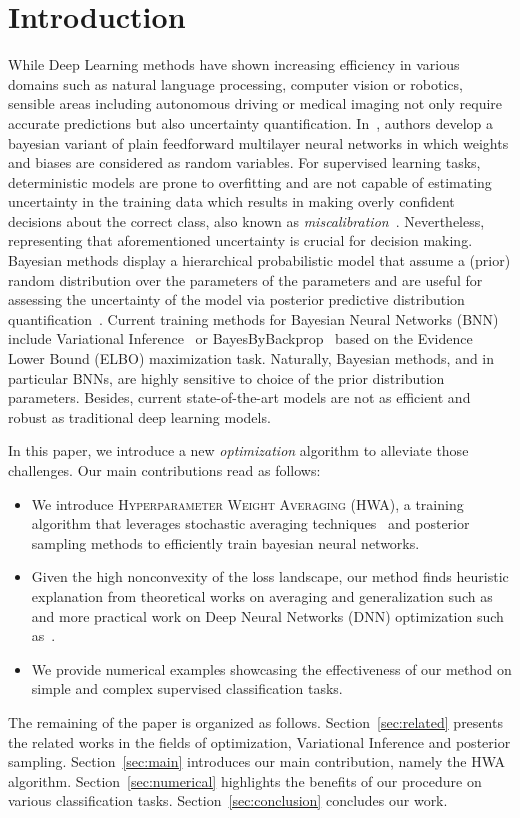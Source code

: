 \documentclass[tablecaption=bottom,wcp]{jmlr}
\begin{document}
\section{Introduction}
While Deep Learning methods have shown increasing efficiency in various domains such as natural language processing, computer vision or robotics, sensible areas including autonomous driving or medical imaging not only require accurate predictions but also uncertainty quantification.
In~\citep{neal2012bayesian}, authors develop a bayesian variant of plain feedforward multilayer neural networks in which weights and biases are considered as random variables.
For supervised learning tasks, deterministic models are prone to overfitting and are not capable of estimating uncertainty in the training data which results in making overly confident decisions about the correct class, also known as \emph{miscalibration}~\citep{guo2017calibration,kendall2017uncertainties}.
Nevertheless, representing that aforementioned uncertainty is crucial for decision making.
Bayesian methods display a hierarchical probabilistic model that assume a (prior) random distribution over the parameters of the parameters and are useful for assessing the uncertainty of the model via posterior predictive distribution quantification~\citep{blundell2015weight,kingma2015variational}.
Current training methods for Bayesian Neural Networks (BNN)~\citep{neal2012bayesian} include Variational Inference~\citep{graves2011practical, hoffman2013stochastic} or BayesByBackprop~\citep{blundell2015weight} based on the Evidence Lower Bound (ELBO) maximization task.
Naturally, Bayesian methods, and in particular BNNs, are highly sensitive to choice of the prior distribution parameters.
Besides, current state-of-the-art models are not as efficient and robust as traditional deep learning models.

In this paper, we introduce a new \emph{optimization} algorithm to alleviate those challenges.
Our main contributions read as follows:
\begin{itemize}
\item We introduce \textsc{Hyperparameter Weight Averaging} (HWA), a training algorithm that leverages stochastic averaging techniques~\citep{polyak1992acceleration} and posterior sampling methods to efficiently train bayesian neural networks.
\item Given the high nonconvexity of the loss landscape, our method finds heuristic explanation from theoretical works on averaging and generalization such as~\citep{keskar2016large,he2019asymmetric} and more practical work on Deep Neural Networks (DNN) optimization such as~\citep{izmailov2018averaging}.
\item We provide numerical examples showcasing the effectiveness of our method on simple and complex supervised classification tasks.
\end{itemize}
The remaining of the paper is organized as follows.
Section~\ref{sec:related} presents the related works in the fields of optimization, Variational Inference and posterior sampling.
Section~\ref{sec:main} introduces our main contribution, namely the HWA algorithm.
Section~\ref{sec:numerical} highlights the benefits of our procedure on various classification tasks.
Section~\ref{sec:conclusion} concludes our work.
 
\end{document}
